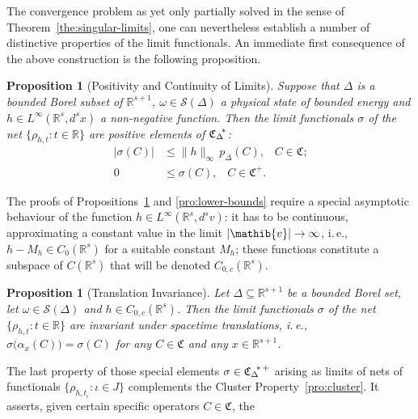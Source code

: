 \documentclass[a4paper,a4paper]{article}
\numberwithin{equation}{section}
\newcommand{\Rbb}{\mathbb{R}}
\newcommand{\Cfrak}{\mathfrak{C}}
\newcommand{\vib}{\mathib{v}}
\newcommand{\Sscr}{\mathscr{S}}
\newcommand{\Rs}{\mathbb{R}^s}
\newcommand{\Rsone}{\mathbb{R}^{s + 1}}
\newcommand{\CDstar}{{\mathfrak{C}_\Delta}^{\negthickspace *}}
\newcommand{\CDstarplus}{{\mathfrak{C}_\Delta}^{\negthickspace *
    \thinspace +}}
\newcommand{\ax}{\alpha_x}
\theoremstyle{definition}
\theoremstyle{plain}
\newtheorem{proposition}[definition]{Proposition}
\theoremstyle{remark}
\newcommand{\bset}[1]{\bigl\{ #1 \bigr\}}
\newcommand{\abs}[1]{\lvert #1 \rvert}
\newcommand{\babs}[1]{\bigl\lvert #1 \bigr\rvert}
\newcommand{\norm}[1]{\lVert #1 \rVert}
\newcommand{\pDx}[1]{p_\Delta ( #1 )}
\begin{document}
  The convergence problem as yet only partially solved in the sense of
  Theorem~\ref{the:singular-limits}, one can nevertheless establish a
  number of distinctive properties of the limit functionals. An
  immediate first consequence of the above construction is the
  following proposition.
  \begin{proposition}[Positivity and Continuity of Limits]
    \label{pro:positivity-of-limits}
    Suppose that $\Delta$ is a bounded Borel subset of\/ $\Rsone$,
    $\omega \in \Sscr ( \Delta )$ a physical state of bounded energy
    and $h \in L^\infty ( \Rs , d^s x )$ a non-negative function. Then
    the limit functionals $\sigma$ of the net $\bset{\rho_{h , t} : t
    \in \Rbb}$ are positive elements of $\CDstar$:
    \begin{subequations}
      \begin{align}
        \babs{\sigma ( C )} & \leqslant \norm{h}_\infty \, \pDx{C}
        \text{,} \quad C \in \Cfrak \text{;} \\
        0 & \leqslant \sigma ( C ) \text{,} \quad C \in \Cfrak^+
        \text{.}
      \end{align}
    \end{subequations}
  \end{proposition}
  The proofs of Propositions~\ref{pro:translation-invariance} and
  \ref{pro:lower-bounds} require a special asymptotic behaviour of the
  function $h \in L^\infty ( \Rs , d^s v )$: it has to be continuous,
  approximating a constant value in the limit $\abs{\vib} \rightarrow
  \infty$, i.\,e., $h - M_h \in C_0 ( \Rs )$ for a suitable constant
  $M_h$; these functions constitute a subspace of $C ( \Rs )$ that
  will be denoted $C_{0 , c} ( \Rs )$.
  \begin{proposition}[Translation Invariance]
    \label{pro:translation-invariance}
    Let $\Delta \subseteq \Rsone$ be a bounded Borel set, let $\omega
    \in \Sscr ( \Delta )$ and $h \in C_{0 , c} ( \Rs )$. Then the
    limit functionals $\sigma$ of the net$\bset{\rho_{h , t} : t \in
    \Rbb}$ are invariant under spacetime translations, i.\,e., $
    \sigma \bigl( \ax ( C ) \bigr) = \sigma ( C )$ for any $C \in
    \Cfrak$ and any $x \in \Rsone$.
  \end{proposition}
  The last property of those special elements $\sigma \in \CDstarplus$
  arising as limits of nets of functionals $\bset{\rho_{h , t_\iota} :
  \iota \in J}$ complements the Cluster Property~\ref{pro:cluster}.
  It asserts, given certain specific operators $C \in \Cfrak$, the
\end{document}

